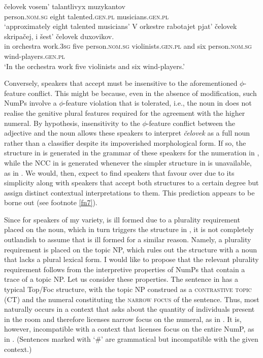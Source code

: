 \documentclass[output=paper,
modfonts,
newtxmath,
hidelinks
]{langscibook}
\begin{document}
{\ea \label{fn17i}
\gll čelovek      vosem’  talantlivyx  muzykantov \\  
	 person.\textsc{nom.sg} eight  talented.\textsc{gen.pl}  musicians.\textsc{gen.pl} \\
\glt `approximately eight talented musicians'  
\z
\ea\label{fn17ii}
\gll V orkestre rabotajet pjat’ čelovek skripačej, i šest’ čelovek duxovikov. \\
	 in orchestra work.\textsc{3sg} five person.\textsc{nom.sg} violinists.\textsc{gen.pl} and six person.\textsc{nom.sg} wind-players.\textsc{gen.pl} \\
\glt `In the orchestra work five violinists and six wind-players.'
\zlast
}

Conversely, speakers that accept  must be insensitive to the aforementioned ${\phi}${}-feature conflict. This might be because, even in the absence of modification, such NumPs involve a ${\phi}${}-feature violation that is tolerated, i.e., the noun in  does not realise the genitive plural features required for the agreement with the higher numeral. By hypothesis, insensitivity to the ${\phi}${}-feature conflict between the adjective and the noun allows these speakers to interpret \textit{čelovek} as a full noun rather than a classifier despite its impoverished morphological form. If so, the structure in  is generated in the grammar of these speakers for the numeration in , while the NCC in  is generated whenever the simpler structure in  is unavailable, as in . We would, then, expect to find speakers that favour  over  due to its simplicity along with speakers that accept both structures to a certain degree but assign distinct contextual interpretations to them. This prediction appears to be borne out (see footnote \ref{fn7}).

\largerpage[2]
Since for speakers of my variety,  is ill formed due to a plurality requirement placed on the noun, which in turn triggers the structure in , it is not completely outlandish to assume that  is ill formed for a similar reason. Namely, a plurality requirement is placed on the topic NP, which rules out the structure with a noun that lacks a plural lexical form. I would like to propose that the relevant plurality requirement follows from the interpretive properties of NumPs that contain a trace of a topic NP. Let us consider these properties. The sentence in  has a typical Top/Foc structure, with the topic NP construed as a \textsc{contrastive topic} (CT) and the numeral constituting the \textsc{narrow focus} of the sentence. Thus,  most naturally occurs in a context that asks about the quantity of individuals present in the room and therefore licenses narrow focus on the numeral, as in . It is, however, incompatible with a context that licenses focus on the entire NumP, as in . (Sentences marked with ‘\#’ are grammatical but incompatible with the given context.)
\end{document}
